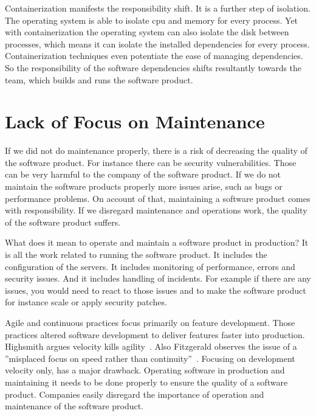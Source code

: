 Containerization manifests the responsibility shift. It is a further step of
isolation. The operating system is able to isolate cpu and memory for every process. Yet
with containerization the operating system can also isolate the disk between processes,
which means it can isolate the installed dependencies for every process. Containerization
techniques even potentiate the ease of managing dependencies. So the responsibility of the
software dependencies shifts resultantly towards the team, which builds and runs the
software product.


\section{Lack of Focus on Maintenance}

If we did not do maintenance properly, there is a risk of decreasing the quality of the
software product. For instance there can be security vulnerabilities. Those can be very
harmful to the company of the software product. If we do not maintain the software
products properly more issues arise, such as bugs or performance problems. On account of
that, maintaining a software product comes with responsibility. If we disregard
maintenance and operations work, the quality of the software product suffers.

What does it mean to operate and maintain a software product in production? It is all the
work related to running the software product. It includes the configuration of the
servers. It includes monitoring of performance, errors and security issues. And it
includes handling of incidents. For example if there are any issues, you would need to
react to those issues and to make the software product for instance scale or apply
security patches.

Agile and continuous practices focus primarily on feature development. Those practices
altered software development to deliver features faster into production. Highsmith argues
velocity kills agility~\cite{velocity_kills}. Also Fitzgerald observes the issue of a
”misplaced focus on speed rather than continuity”~\cite{continuous_fitzgerald}. Focusing
on development velocity only, has a major drawback. Operating software in production and
maintaining it needs to be done properly to ensure the quality of a software
product. Companies easily disregard the importance of operation and maintenance of the
software product.


